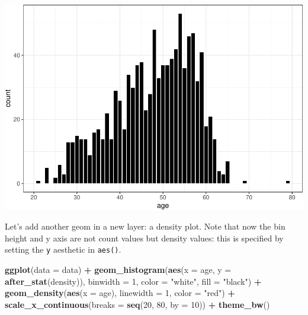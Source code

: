 \documentclass[
]{book}
\newenvironment{Shaded}{\begin{snugshade}}{\end{snugshade}}
\newcommand{\AttributeTok}[1]{\textcolor[rgb]{0.13,0.29,0.53}{#1}}
\newcommand{\DecValTok}[1]{\textcolor[rgb]{0.00,0.00,0.81}{#1}}
\newcommand{\FunctionTok}[1]{\textcolor[rgb]{0.13,0.29,0.53}{\textbf{#1}}}
\newcommand{\NormalTok}[1]{#1}
\newcommand{\SpecialCharTok}[1]{\textcolor[rgb]{0.81,0.36,0.00}{\textbf{#1}}}
\newcommand{\StringTok}[1]{\textcolor[rgb]{0.31,0.60,0.02}{#1}}
\begin{document}
\includegraphics{R-for-social-research-and-business-analytics_files/figure-latex/unnamed-chunk-21-1.pdf}

Let's add another geom in a new layer: a density plot. Note that now the bin height and y axis are not count values but density values: this is specified by setting the \texttt{y} aesthetic in \texttt{aes()}.

\begin{Shaded}
\begin{Highlighting}[]
\FunctionTok{ggplot}\NormalTok{(}\AttributeTok{data =}\NormalTok{ data) }\SpecialCharTok{+}
  \FunctionTok{geom\_histogram}\NormalTok{(}\FunctionTok{aes}\NormalTok{(}\AttributeTok{x =}\NormalTok{ age, }\AttributeTok{y =} \FunctionTok{after\_stat}\NormalTok{(density)), }\AttributeTok{binwidth =} \DecValTok{1}\NormalTok{,}
                 \AttributeTok{color =} \StringTok{"white"}\NormalTok{, }\AttributeTok{fill =} \StringTok{"black"}\NormalTok{) }\SpecialCharTok{+}
  \FunctionTok{geom\_density}\NormalTok{(}\FunctionTok{aes}\NormalTok{(}\AttributeTok{x =}\NormalTok{ age), }\AttributeTok{linewidth =} \DecValTok{1}\NormalTok{, }\AttributeTok{color =} \StringTok{"red"}\NormalTok{) }\SpecialCharTok{+}
  \FunctionTok{scale\_x\_continuous}\NormalTok{(}\AttributeTok{breaks =} \FunctionTok{seq}\NormalTok{(}\DecValTok{20}\NormalTok{, }\DecValTok{80}\NormalTok{, }\AttributeTok{by =} \DecValTok{10}\NormalTok{)) }\SpecialCharTok{+}
  \FunctionTok{theme\_bw}\NormalTok{()}
\end{Highlighting}
\end{Shaded}
\end{document}
